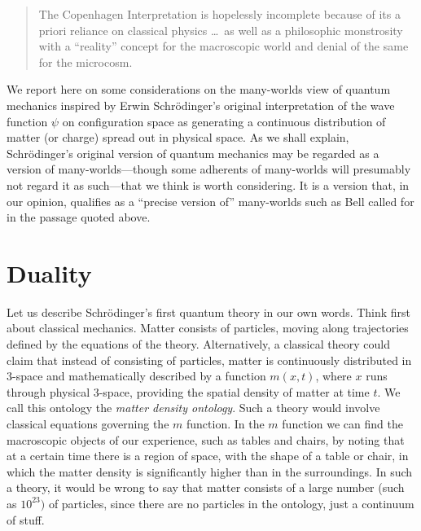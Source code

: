 \documentclass[12pt]{article}
\newcommand{\x}[1]{{#1}}
\begin{document}
\begin{quotation}
The Copenhagen Interpretation is hopelessly incomplete because of its a priori reliance on classical physics \ldots\ as well as a philosophic monstrosity with a ``reality'' concept for the macroscopic world and denial of the same for the microcosm.
\end{quotation}

We report here on some considerations on the many-worlds view of quantum mechanics inspired by \x{Erwin} Schr\"odinger's \cite{sch1} original interpretation of the wave function $\psi$ on configuration space as generating a continuous distribution of matter (or charge) spread out in physical space. 
As we shall explain, Schr\"odinger's original version of quantum mechanics may be regarded as a version of many-worlds---though some adherents of many-worlds will presumably not regard it as such---that we think is worth considering. It is a version that, in our opinion, qualifies as a ``precise version of'' many-worlds such as Bell called for in the passage quoted above. 


\section{Duality}

Let us describe Schr\"odinger's first quantum theory in our own words.
Think first about classical mechanics. Matter consists of particles, moving along trajectories defined by the equations of the theory. Alternatively, a classical theory could claim that instead of consisting of particles, matter is continuously distributed in 3-space and mathematically described by a function $m(x,t)$, where $x$ runs through physical 3-space, providing the spatial density of matter at time $t$. We call this ontology the \emph{matter density ontology}. Such a theory would involve classical equations governing the $m$ function. In the $m$ function we can find the macroscopic objects of our experience, such as tables and chairs, by noting that at a certain time there is a region of space, with the shape of a table or chair, in which the matter density is significantly higher than in the surroundings. In such a theory, it would be wrong to say that matter consists of a large number (such as $10^{23})$ of particles, since there are no particles in the ontology, just a continuum of stuff.
\end{document}
